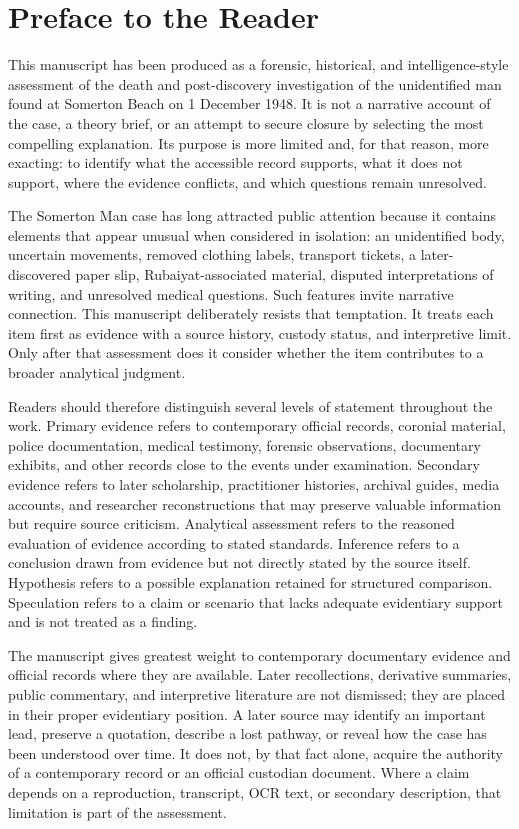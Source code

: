 \chapter*{Preface to the Reader}

This manuscript has been produced as a forensic, historical, and intelligence-style assessment of the death and post-discovery investigation of the unidentified man found at Somerton Beach on 1 December 1948. It is not a narrative account of the case, a theory brief, or an attempt to secure closure by selecting the most compelling explanation. Its purpose is more limited and, for that reason, more exacting: to identify what the accessible record supports, what it does not support, where the evidence conflicts, and which questions remain unresolved.

The Somerton Man case has long attracted public attention because it contains elements that appear unusual when considered in isolation: an unidentified body, uncertain movements, removed clothing labels, transport tickets, a later-discovered paper slip, Rubaiyat-associated material, disputed interpretations of writing, and unresolved medical questions. Such features invite narrative connection. This manuscript deliberately resists that temptation. It treats each item first as evidence with a source history, custody status, and interpretive limit. Only after that assessment does it consider whether the item contributes to a broader analytical judgment.

Readers should therefore distinguish several levels of statement throughout the work. Primary evidence refers to contemporary official records, coronial material, police documentation, medical testimony, forensic observations, documentary exhibits, and other records close to the events under examination. Secondary evidence refers to later scholarship, practitioner histories, archival guides, media accounts, and researcher reconstructions that may preserve valuable information but require source criticism. Analytical assessment refers to the reasoned evaluation of evidence according to stated standards. Inference refers to a conclusion drawn from evidence but not directly stated by the source itself. Hypothesis refers to a possible explanation retained for structured comparison. Speculation refers to a claim or scenario that lacks adequate evidentiary support and is not treated as a finding.

The manuscript gives greatest weight to contemporary documentary evidence and official records where they are available. Later recollections, derivative summaries, public commentary, and interpretive literature are not dismissed; they are placed in their proper evidentiary position. A later source may identify an important lead, preserve a quotation, describe a lost pathway, or reveal how the case has been understood over time. It does not, by that fact alone, acquire the authority of a contemporary record or an official custodian document. Where a claim depends on a reproduction, transcript, OCR text, or secondary description, that limitation is part of the assessment.

